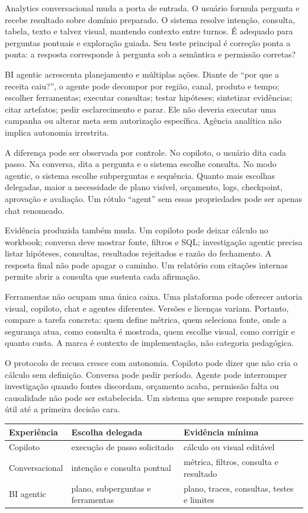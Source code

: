 Analytics conversacional muda a porta de entrada. O usuário formula pergunta e recebe resultado sobre domínio preparado. O sistema resolve intenção, consulta, tabela, texto e talvez visual, mantendo contexto entre turnos. É adequado para perguntas pontuais e exploração guiada. Seu teste principal é correção ponta a ponta: a resposta corresponde à pergunta sob a semântica e permissão corretas?

BI agentic acrescenta planejamento e múltiplas ações. Diante de ``por que a receita caiu?'', o agente pode decompor por região, canal, produto e tempo; escolher ferramentas; executar consultas; testar hipóteses; sintetizar evidências; citar artefatos; pedir esclarecimento e parar. Ele não deveria executar uma campanha ou alterar meta sem autorização específica. Agência analítica não implica autonomia irrestrita.

A diferença pode ser observada por controle. No copiloto, o usuário dita cada passo. Na conversa, dita a pergunta e o sistema escolhe consulta. No modo agentic, o sistema escolhe subperguntas e sequência. Quanto mais escolhas delegadas, maior a necessidade de plano visível, orçamento, logs, checkpoint, aprovação e avaliação. Um rótulo ``agent'' sem essas propriedades pode ser apenas chat renomeado.

Evidência produzida também muda. Um copiloto pode deixar cálculo no workbook; conversa deve mostrar fonte, filtros e SQL; investigação agentic precisa listar hipóteses, consultas, resultados rejeitados e razão do fechamento. A resposta final não pode apagar o caminho. Um relatório com citações internas permite abrir a consulta que sustenta cada afirmação.

Ferramentas não ocupam uma única caixa. Uma plataforma pode oferecer autoria visual, copiloto, chat e agentes diferentes. Versões e licenças variam. Portanto, compare a tarefa concreta: quem define métrica, quem seleciona fonte, onde a segurança atua, como consulta é mostrada, quem escolhe visual, como corrigir e quanto custa. A marca é contexto de implementação, não categoria pedagógica.

O protocolo de recusa cresce com autonomia. Copiloto pode dizer que não cria o cálculo sem definição. Conversa pode pedir período. Agente pode interromper investigação quando fontes discordam, orçamento acaba, permissão falta ou causalidade não pode ser estabelecida. Um sistema que sempre responde parece útil até a primeira decisão cara.

\begin{center}
\begingroup\small\setlength{\tabcolsep}{3pt}
\begin{tabularx}{\textwidth}{p{2.8cm}Y Y}
\toprule
Experiência & Escolha delegada & Evidência mínima \\
\midrule
Copiloto & execução de passo solicitado & cálculo ou visual editável \\
Conversacional & intenção e consulta pontual & métrica, filtros, consulta e resultado \\
BI agentic & plano, subperguntas e ferramentas & plano, traces, consultas, testes e limites \\
\bottomrule
\end{tabularx}
\endgroup
\end{center}

